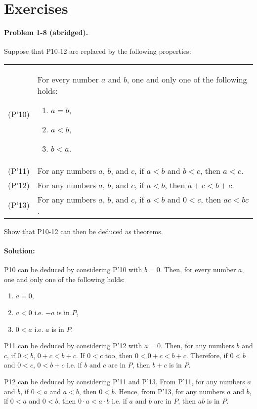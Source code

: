 \documentclass{article}
\begin{document}
\section*{Exercises}

\paragraph{Problem 1-8 (abridged).} Suppose that P10-12 are replaced by the
following properties:

\begin{tabular}{l p{4in}}
  (P'10) & For every number $a$ and $b$, one and only one of the following
  holds: \begin{enumerate}
    \itemsep0em
    \item $a = b$,
    \item $a < b$,
    \item $b < a$.
  \end{enumerate} \\
  (P'11) & For any numbers $a$, $b$, and $c$, if $a < b$ and $b < c$, then $a <
  c$. \\
  (P'12) & For any numbers $a$, $b$, and $c$, if $a < b$, then $a + c < b + c$.
  \\
  (P'13) & For any numbers $a$, $b$, and $c$, if $a < b$ and $0 < c$, then $ac
  < bc$. \\
\end{tabular}

Show that P10-12 can then be deduced as theorems.

\paragraph{Solution:} P10 can be deduced by considering P'10 with $b = 0$.
Then, for every number $a$, one and only one of the following holds:
\begin{enumerate}
  \itemsep0em
  \item $a = 0$,
  \item $a < 0$ i.e. $-a$ is in $P$,
  \item $0 < a$ i.e. $a$ is in $P$.
\end{enumerate}

P11 can be deduced by considering P'12 with $a = 0$. Then, for any numbers $b$
and $c$, if $0 < b$, $0 + c < b + c$. If $0 < c$ too, then $0 < 0 + c < b + c$.
Therefore, if $0 < b$ and $0 < c$, $0 < b + c$ i.e. if $b$ and $c$ are in $P$,
then $b + c$ is in $P$.

P12 can be deduced by considering P'11 and P'13. From P'11, for any numbers $a$
and $b$, if $0 < a$ and $a < b$, then $0 < b$. Hence, from P'13, for any
numbers $a$ and $b$, if $0 < a$ and $0 < b$, then $0 \cdot a < a \cdot b$ i.e.
if $a$ and $b$ are in $P$, then $ab$ is in $P$.
\end{document}
